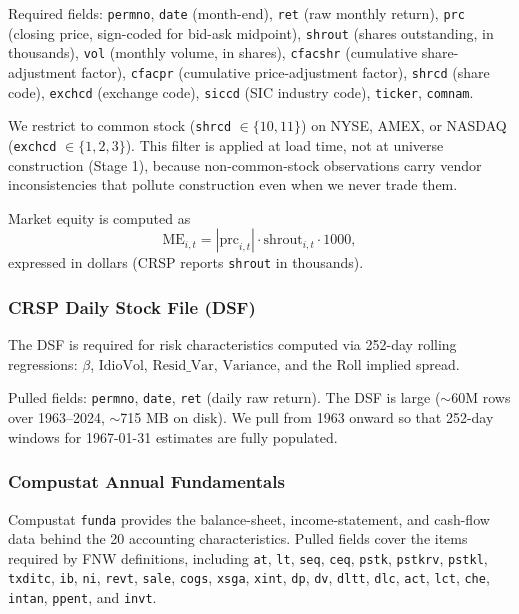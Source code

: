 Required fields: \texttt{permno}, \texttt{date} (month-end),
\texttt{ret} (raw monthly return), \texttt{prc} (closing price,
sign-coded for bid-ask midpoint), \texttt{shrout} (shares outstanding,
in thousands), \texttt{vol} (monthly volume, in shares),
\texttt{cfacshr} (cumulative share-adjustment factor),
\texttt{cfacpr} (cumulative price-adjustment factor),
\texttt{shrcd} (share code), \texttt{exchcd} (exchange code),
\texttt{siccd} (SIC industry code), \texttt{ticker}, \texttt{comnam}.

We restrict to common stock (\texttt{shrcd} $\in \{10, 11\}$) on NYSE,
AMEX, or NASDAQ (\texttt{exchcd} $\in \{1, 2, 3\}$). This filter is
applied at load time, not at universe construction (Stage 1), because
non-common-stock observations carry vendor inconsistencies that pollute
construction even when we never trade them.

Market equity is computed as
\begin{equation}
\mathrm{ME}_{i,t} = |\mathrm{prc}_{i,t}| \cdot \mathrm{shrout}_{i,t} \cdot 1000,
\label{eq:me-defn}
\end{equation}
expressed in dollars (CRSP reports \texttt{shrout} in thousands).

\subsubsection{CRSP Daily Stock File (DSF)}

The DSF is required for risk characteristics computed via 252-day
rolling regressions: \(\beta\), \(\mathrm{IdioVol}\),
\(\mathrm{Resid\_Var}\), \(\mathrm{Variance}\), and the
Roll \cite{Roll1984} implied spread.

Pulled fields: \texttt{permno}, \texttt{date}, \texttt{ret} (daily raw
return). The DSF is large (\(\sim\)60M rows over 1963--2024, \(\sim\)715
MB on disk). We pull from 1963 onward so that 252-day windows for
1967-01-31 estimates are fully populated.

\subsubsection{Compustat Annual Fundamentals}

Compustat \texttt{funda} provides the balance-sheet, income-statement,
and cash-flow data behind the 20 accounting characteristics. Pulled
fields cover the items required by FNW definitions, including
\texttt{at}, \texttt{lt}, \texttt{seq}, \texttt{ceq}, \texttt{pstk},
\texttt{pstkrv}, \texttt{pstkl}, \texttt{txditc}, \texttt{ib},
\texttt{ni}, \texttt{revt}, \texttt{sale}, \texttt{cogs}, \texttt{xsga},
\texttt{xint}, \texttt{dp}, \texttt{dv}, \texttt{dltt}, \texttt{dlc},
\texttt{act}, \texttt{lct}, \texttt{che}, \texttt{intan},
\texttt{ppent}, and \texttt{invt}.


